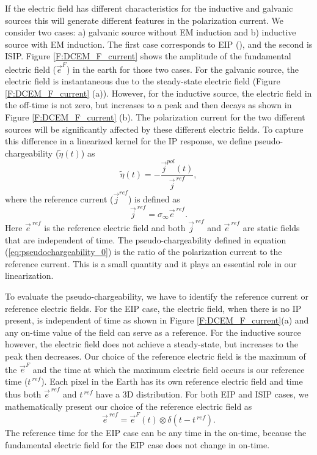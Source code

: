 \documentclass[a4paper, 11pt]{article}
\newcommand{\siginf}{\sigma_\infty}
\renewcommand {\j}  { {\vec j} }
\newcommand {\e}  { {\vec e} }
\newcommand{\peta}{\tilde{\eta}}
\newcommand{\eref}{\e^{\ ref}}
\begin{document}
If the electric field has different characteristics for the inductive and galvanic sources this will generate different features in the polarization current.  
We consider two cases: a) galvanic source without EM induction and b) inductive source with EM induction. The first case corresponds to EIP (\cite{seigel1959}), and the second is ISIP.
Figure \ref{F:DCEM_F_current} shows the amplitude of the fundamental electric field ($\e^{F}$) in the earth for those two cases. 
For the galvanic source, the electric field is instantaneous due to the steady-state electric field (Figure \ref{F:DCEM_F_current} (a)). 
However, for the inductive source, the electric field in the off-time is not zero, but increases to a peak and then decays as shown in Figure \ref{F:DCEM_F_current} (b). 
The polarization current for the two different sources will be significantly affected by these different electric fields. 
To capture this difference in a linearized kernel for the IP response, we define pseudo-chargeability ($\peta(t)$) as 
\begin{equation}
  \peta(t) = -\frac{\j^{pol}(t)}{\j^{\ ref}},
  \label{eq:pseudochargeability_0}
\end{equation}
where the reference current ($\j^{ref}$) is defined as 
\begin{equation}
  \j^{\ ref} = \siginf \eref.
  \label{eq:reference_current}
\end{equation}
Here $\eref$ is the reference electric field and both $\j^{\ ref}$ and $\eref$ are static fields that are independent of time. 
The pseudo-chargeability defined in equation (\ref{eq:pseudochargeability_0})  is the ratio of  the polarization current to the reference current. This is a small quantity and it plays an essential role in our linearization. 

To evaluate the pseudo-chargeability, we have to identify the reference current or reference electric fields. For the EIP case, the electric field, when there is no IP present, is independent of time as shown in Figure \ref{F:DCEM_F_current}(a) and any on-time value of the field can serve as a reference. For the inductive source however, the electric field does not achieve a steady-state, but increases to the peak then decreases. Our choice of the reference electric field is the maximum of the $\e^{F}$ and the  time at which the  maximum electric field occurs is our reference time ($t^{\ ref}$).
Each pixel in the Earth has its own reference electric field and time thus  both $\eref$ and $t^{\ ref}$ have a 3D distribution. 
For both EIP and ISIP cases, we mathematically present our choice of the reference electric field as
\begin{equation}
  \eref = \e^{F}(t) \otimes \delta(t-t^{\ ref}). 
  \label{eq:reference_electricfield}
\end{equation}
The reference time for the EIP case can be any time in the on-time, because the fundamental electric field for the EIP case does not change in on-time. 
\end{document}
